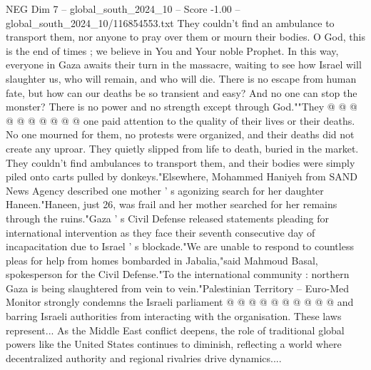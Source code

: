 \begin{textsample}{NEG Dim 7 – global\_south\_2024\_10 – Score -1.00 – global\_south\_2024\_10/116854553.txt}
They couldn't find an ambulance to transport them, nor anyone to pray over them or mourn their bodies.
O God, this is the end of times ; we believe in You and Your noble Prophet.
In this way, everyone in Gaza awaits their turn in the massacre, waiting to see how Israel will slaughter us, who will remain, and who will die.
There is no escape from human fate, but how can our deaths be so transient and easy?
And no one can stop the monster?
There is no power and no strength except through God.""They @ @ @ @ @ @ @ @ @ @ one paid attention to the quality of their lives or their deaths.
No one mourned for them, no protests were organized, and their deaths did not create any uproar.
They quietly slipped from life to death, buried in the market.
They couldn't find ambulances to transport them, and their bodies were simply piled onto carts pulled by donkeys."Elsewhere, Mohammed Haniyeh from SAND News Agency described one mother ' s agonizing search for her daughter Haneen."Haneen, just 26, was frail and her mother searched for her remains through the ruins."Gaza ' s Civil Defense released statements pleading for international intervention as they face their seventh consecutive day of incapacitation due to Israel ' s blockade."We are unable to respond to countless pleas for help from homes bombarded in Jabalia,"said Mahmoud Basal, spokesperson for the Civil Defense."To the international community : northern Gaza is being slaughtered from vein to vein."Palestinian Territory -- Euro-Med Monitor strongly condemns the Israeli parliament @ @ @ @ @ @ @ @ @ @ and barring Israeli authorities from interacting with the organisation.
These laws represent...
As the Middle East conflict deepens, the role of traditional global powers like the United States continues to diminish, reflecting a world where decentralized authority and regional rivalries drive dynamics....

\end{textsample}

